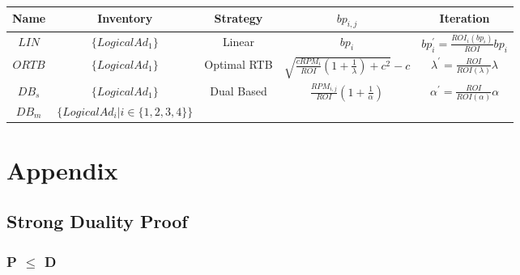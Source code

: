 \documentclass{article}
\theoremstyle{definition}
\newcommand{\sbp}{bp_{i,j}}
\newcommand{\sRPM}{RPM_{i,j}}
\newcommand{\ortbbp}{\sqrt{\frac{cRPM_i}{ROI}(1+\frac{1}{\lambda})+c^2}-c}
\newcommand{\dbbp}{\frac{\sRPM}{ROI}(1+\frac{1}{\alpha})}
\newcommand{\liniter}{bp_i^{'}=\frac{ROI_i(bp_i)}{ROI}bp_i}
\newcommand{\ortbiter}{\lambda^{'}=\frac{ROI}{ROI(\lambda)}\lambda}
\newcommand{\dbiter}{\alpha^{'} = \frac{ROI}{ROI(\alpha)}\alpha}
\begin{document}
\begin{CJK}{UTF8}{gbsn}
\begin{center}
\begin{tabular}{|c|c|c|c|c|}
\hline
Name     & Inventory                           & Strategy                    & $\sbp$
    & Iteration \\
\hline
$LIN$    & $\{LogicalAd_1\}$                   & Linear                      & $bp_i$
    & $\liniter$ \\
\hline
$ORTB$   & $\{LogicalAd_1\}$                   & Optimal RTB                 & $\ortbbp$
    & $\ortbiter$ \\
\hline
$DB_{s}$ & $\{LogicalAd_1\}$                   & \multirow{2}{*}{Dual Based} & \multirow{2}{*}{$\dbbp$}
    & \multirow{2}{*}{$\dbiter$} \\
\cline{1-2}
$DB_{m}$ & $\{LogicalAd_i|i \in \{1,2,3,4\}\}$ &                             &
    & \\ 
\hline
\end{tabular}
\end{center}

\newpage
\section{Appendix}

\subsection{Strong Duality Proof}

\subsubsection{P $\le$ D}


\end{CJK}
\end{document}
